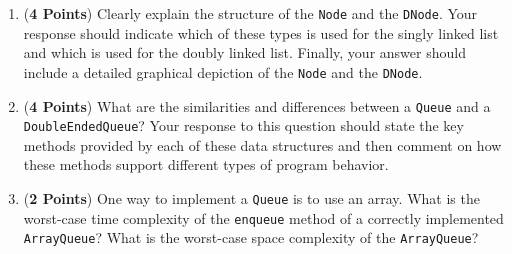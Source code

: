 \documentclass[12pt]{article}
\begin{document}
\begin{enumerate}
\begin{enumerate}

  \item ({\bf 4 Points}) Clearly explain the structure of the {\tt Node} and the {\tt DNode}.  Your response should
    indicate which of these types is used for the singly linked list and which is used for the doubly linked list.
    Finally, your answer should include a detailed graphical depiction of the {\tt Node} and the {\tt DNode}.

  \item ({\bf 4 Points}) What are the similarities and differences between a {\tt Queue} and a {\tt DoubleEndedQueue}?
    Your response to this question should state the key methods provided by each of these data structures and then
    comment on how these methods support different types of program behavior.

  \item ({\bf 2 Points}) One way to implement a {\tt Queue} is to use an array.  What is the worst-case time complexity
    of the {\tt enqueue} method of a correctly implemented {\tt ArrayQueue}? What is the worst-case space complexity of
    the {\tt ArrayQueue}?






\end{enumerate}
\end{enumerate}
\end{document}
